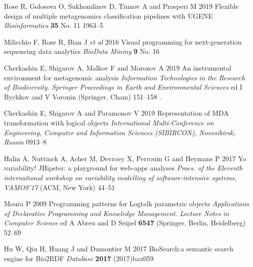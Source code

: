 \documentclass[a4paper]{jpconf}
\renewcommand{\doi}[1]{} %
\begin{document}
\begin{thebibliography}{0}
  Rose R, Golosova O, Sukhomlinov D, Tiunov A and Prosperi M 2019 Flexible design of multiple metagenomics classification pipelines with UGENE \emph{Bioinformatics} \textbf{35} No. 11 1963--5 \doi{10.1093/bioinformatics/bty901}

 Milicchio F, Rose R, Bian J \emph{et al} 2016 Visual programming for next-generation sequencing data analytics \emph{BioData Mining} \textbf{9} No. 16 \doi{10.1186/s13040-016-0095-3}

 Cherkashin E, Shigarov A, Malkov F and Morozov A 2019 An instrumental environment for metagenomic analysis \emph{Information Technologies in the Research of Biodiversity. Springer Proceedings in Earth and Environmental Sciences} ed I Bychkov and V Voronin (Springer, Cham) 151--158 \doi{10.1007/978-3-030-11720-7_20}.

  Cherkashin E, Shigarov A and Paramonov V 2019 Representation of MDA transformation with logical objects \emph{International Multi-Conference on Engineering, Computer and Information Sciences (SIBIRCON), Novosibirsk, Russia} 0913--8 \doi{10.1109/SIBIRCON48586.2019.8958008}

 Halin A, Nuttinck A, Acher M, Devroey X, Perrouin G and Heymans P 2017 Yo variability! JHipster: a playground for web-apps analyses \emph{Procs. of the Eleventh international workshop on variability modelling of software-intensive systems, VAMOS’17} (ACM, New York) 44–51 \doi{10.1145/3023956.3023963}

 Moura P 2009 Programming patterns for Logtalk parametric objects \emph{Applications of Declarative Programming and Knowledge Management. Lecture Notes in Computer Science} ed A Abreu and D Seipel \textbf{6547} (Springer, Berlin, Heidelberg) 52--69 \doi{10.1007/978-3-642-20589-7_4}

 Hu W, Qiu H, Huang J and Dumontier M 2017 BioSearch:\@ a semantic search engine for Bio2RDF \emph{Database} \textbf{2017} (2017)bax059 \doi{10.1093/database/bax059}














\end{thebibliography}
\end{document}
